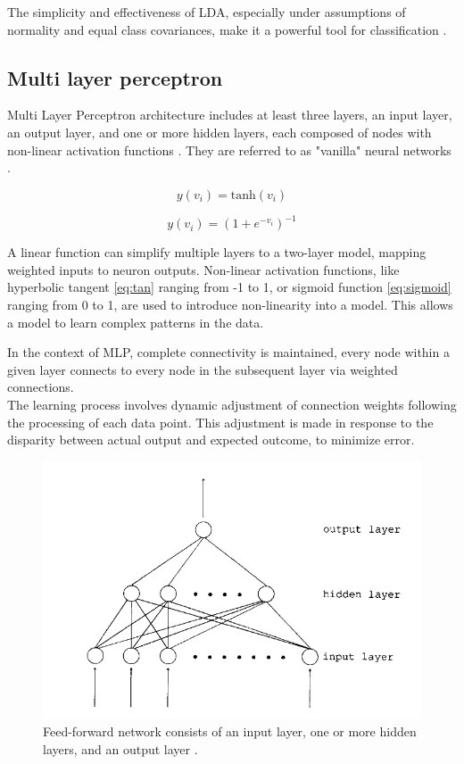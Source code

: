             The simplicity and effectiveness of LDA, especially under assumptions of normality and equal class covariances, make it a powerful tool for classification \cite{balakrishnama_linear_nodate}.

        \subsection{Multi layer perceptron}
            Multi Layer Perceptron architecture includes at least three layers, an input layer, an output layer, and one or more hidden layers, each composed of nodes with non-linear activation functions \cite{svozil_introduction_1997}. They are referred to as "vanilla" neural networks \cite{hastie_elements_2009}.

        \begin{equation}\label{eq:tan}
            y(v_i) = \text{tanh}(v_i) 
        \end{equation}

        \begin{equation}\label{eq:sigmoid}
            y(v_i) = (1+e^{-v_i})^{-1} 
        \end{equation}

            A linear function can simplify multiple layers to a two-layer model, mapping weighted inputs to neuron outputs. Non-linear activation functions, like hyperbolic tangent \ref{eq:tan} ranging from -1 to 1, or sigmoid function \ref{eq:sigmoid} ranging from 0 to 1, are used to introduce non-linearity into a model. This allows a model to learn complex patterns in the data.

        \newpage

        In the context of MLP, complete connectivity is maintained, every node within a given layer connects to every node in the subsequent layer via weighted connections. \\
        The learning process involves dynamic adjustment of connection weights following the processing of each data point. This adjustment is made in response to the disparity between actual output and expected outcome, to minimize error.

        \begin{figure}[H]
            \centering
            \includegraphics[width=.7\textwidth]{../src/resources/images/models/feedforward.png}
            \caption{
                Feed-forward network consists of an input layer, one or more hidden layers, and an output layer \cite{svozil_introduction_1997}.
            }
            \label{fig:multi_layer_perceptron}
        \end{figure}
    
